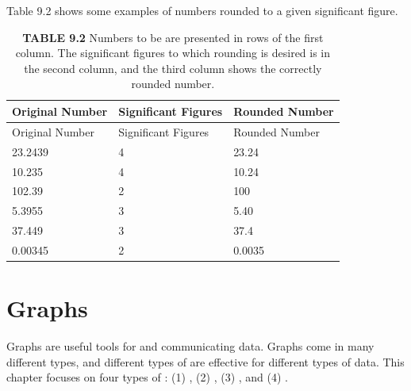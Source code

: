 \documentclass[
  openany]{krantz}
\begin{document}
Table 9.2 shows some examples of numbers rounded to a given significant figure.

\begin{longtable}[]{@{}lll@{}}
\caption{\textbf{TABLE 9.2} Numbers to be  are presented in rows of the first column. The significant figures to which rounding is desired is in the second column, and the third column shows the correctly rounded number.}\tabularnewline
\toprule
Original Number & Significant Figures & Rounded Number \\
\midrule
\endfirsthead
\toprule
Original Number & Significant Figures & Rounded Number \\
\midrule
\endhead
23.2439 & 4 & 23.24 \\
10.235 & 4 & 10.24 \\
102.39 & 2 & 100 \\
5.3955 & 3 & 5.40 \\
37.449 & 3 & 37.4 \\
0.00345 & 2 & 0.0035 \\
\bottomrule
\end{longtable}

\hypertarget{Chapter_10}{%
\chapter{Graphs}\label{Chapter_10}}

Graphs are useful tools for  and communicating data.
Graphs come in many different types, and different types of  are effective for different types of data.
This chapter focuses on four types of : (1) , (2) , (3) , and (4) .
\end{document}
